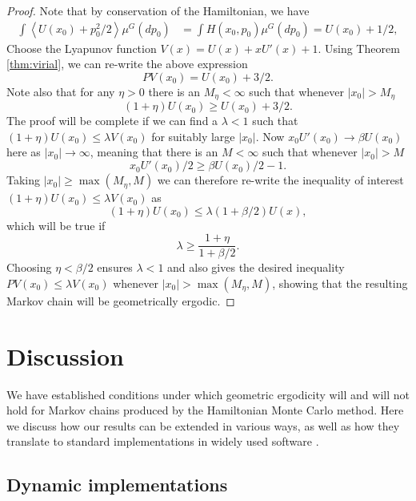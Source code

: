 \documentclass[bj,numbers,noshowframe]{imsart}
\theoremstyle{definition}
\theoremstyle{plain}
\theoremstyle{definition}
\begin{document}
\begin{proof}
Note that by conservation of the Hamiltonian, we have
\begin{align} \label{eqn:conserveh}
\int \left< U(x_0) + p_0^2/2 \right> \mu^G(dp_0)  &= \int H(x_0,p_0)\mu^G(dp_0) = U(x_0) + 1/2,
\end{align}
Choose the Lyapunov function $V(x) = U(x) + xU'(x) + 1$.  Using Theorem \ref{thm:virial}, we can re-write the above expression
\[
PV(x_0)  = U(x_0) + 3/2.
\]
Note also that for any $\eta > 0$ there is an $M_\eta<\infty$ such that whenever $|x_0|>M_\eta$
\[
(1+\eta)U(x_0) \geq U(x_0) + 3/2.
\]
The proof will be complete if we can find a $\lambda < 1$ such that $(1+\eta)U(x_0) \leq \lambda V(x_0)$ for suitably large $|x_0|$.  Now $x_0U'(x_0) \to \beta U(x_0)$ here as $|x_0| \to \infty$, meaning that there is an $M<\infty$ such that whenever $|x_0|>M$
\[
x_0 U'(x_0)/2 \geq \beta U(x_0)/2 - 1.
\]
Taking $|x_0|\geq \max(M_\eta,M)$ we can therefore re-write the inequality of interest $(1+\eta)U(x_0) \leq \lambda V(x_0)$ as
\[
(1+\eta)U(x_0) \leq \lambda (1+\beta/2) U(x),
\]
which will be true if
\[
\lambda \geq \frac{1+\eta}{1+\beta/2}.
\]
Choosing $\eta<\beta/2$ ensures $\lambda <1$ and also gives the desired inequality $PV(x_0) \leq \lambda V(x_0)$ whenever $|x_0| > \max(M_\eta,M)$, showing that the resulting Markov chain will be geometrically ergodic.
\end{proof}

\section{Discussion}
\label{sec:discussion}

We have established conditions under which geometric ergodicity will and will not hold for Markov chains produced by the Hamiltonian Monte Carlo method.  Here we discuss how our results can be extended in various ways, as well as how they translate to standard implementations in widely used software \citep{carpenter2016stan}.

\subsection{Dynamic implementations}
\end{document}
